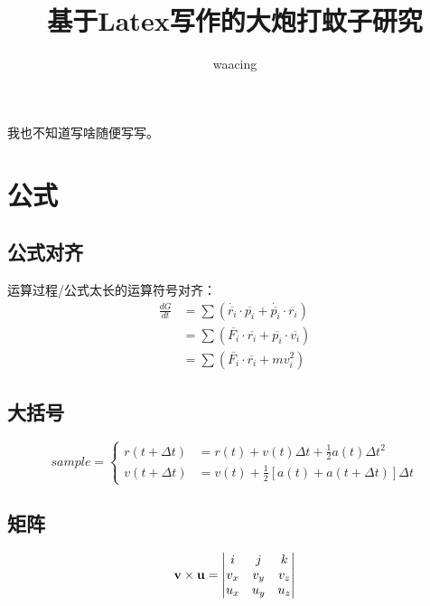 \documentclass[UTF8,a4paper,10pt]{article}
\title{基于Latex写作的大炮打蚊子研究}
\author{waacing}
\begin{document}
	\maketitle 
	我也不知道写啥随便写写。
	\section{公式}
	\subsection{公式对齐}
	运算过程/公式太长的运算符号对齐：
	\begin{equation} \label{}
		\begin{aligned}
			\frac{dG}{dt}&=\sum(\dot{\overline{r_i}}\cdot \overline{p_i} + \dot{\overline{p_i}} \cdot \overline{r_i} ) \\
			&=\sum(\overline{F_i}\cdot \overline{r_i} + \overline{p_i} \cdot \overline{v_i}) \\
			&=\sum(\overline{F_i}\cdot \overline{r_i} + mv_i^2)
		\end{aligned}
	\end{equation}
	
	\subsection{大括号}
	\begin{equation}
		sample = \left\{ 
		\begin{aligned}
			r(t+\Delta t)&=r(t)+v(t)\Delta t+\frac{1}{2}a(t)\Delta t^2 \\
			v(t+\Delta t)&=v(t)+\frac{1}{2}[a(t)+a(t+\Delta t)]\Delta t
		\end{aligned}
		\right.
	\end{equation}
	
	\subsection{矩阵}
	\begin{equation} 
		\begin{gathered}
			\vb{v} \times \vb{u} = 
			\begin{aligned}
				\begin{vmatrix} 
					i & j & k \\ 
					v_x & v_y  & v_z \\ 
					u_x & u_y & u_z
				\end{vmatrix}
			\end{aligned}
		\end{gathered}
	\end{equation}
\end{document}
